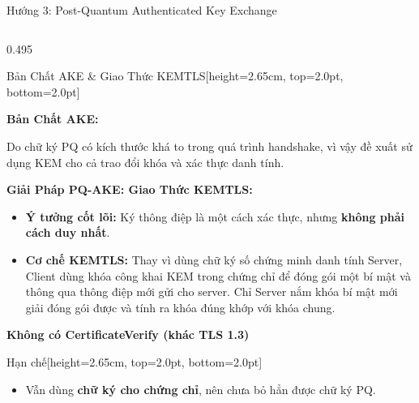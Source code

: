 \documentclass[aspectratio=169, 10pt]{beamer}
\begin{document}
\begin{frame}{Hướng 3: Post-Quantum Authenticated Key Exchange}
	\begin{columns}[T]
		\begin{column}{0.495\textwidth}
			\begin{accentcard}[uetblue]{Bản Chất AKE \& Giao Thức KEMTLS}[height=2.65cm, top=2.0pt, bottom=2.0pt]
				\raggedright\fontsize{5.6pt}{6.9pt}\selectfont
				\textbf{Bản Chất AKE:}\par
				Do chữ ký PQ có kích thước khá to trong quá trình handshake, vì vậy đề xuất sử dụng KEM cho cả trao đổi khóa và xác thực danh tính.\par\vspace{2pt}
				\textbf{\color{uetblue}Giải Pháp PQ-AKE: Giao Thức KEMTLS:}\par
				\setlength{\leftmargini}{8pt}
				\begin{itemize}\setlength{\itemsep}{1.2pt}\setlength{\topsep}{0pt}\fontsize{5.3pt}{6.5pt}\selectfont
					\item \textbf{Ý tưởng cốt lõi:} Ký thông điệp là một cách xác thực, nhưng \textbf{không phải cách duy nhất}.
					\item \textbf{Cơ chế KEMTLS:} Thay vì dùng chữ ký số chứng minh danh tính Server, Client dùng khóa công khai KEM trong chứng chỉ để đóng gói một bí mật và thông qua thông điệp mới gửi cho server. Chỉ Server nắm khóa bí mật mới giải đóng gói được và tính ra khóa đúng khớp với khóa chung.
				\end{itemize}
				\vspace{1.5pt}
				{\fontsize{5.3pt}{6.5pt}\selectfont\textbf{\color{uetred}Không có CertificateVerify (khác TLS 1.3)}\par}
			\end{accentcard}\par\nointerlineskip\vspace{0.06cm}\noindent
			\begin{accentcard}[uetred]{Hạn chế}[height=2.65cm, top=2.0pt, bottom=2.0pt]
				\raggedright
				\setlength{\leftmargini}{8pt}
				\begin{itemize}\setlength{\itemsep}{1.6pt}\setlength{\topsep}{0pt}\fontsize{5.4pt}{6.6pt}\selectfont
					\item Vẫn dùng \textbf{chữ ký cho chứng chỉ}, nên chưa bỏ hẳn được chữ ký PQ.

\end{itemize}
\end{accentcard}
\end{column}
\end{columns}
\end{frame}
\end{document}
